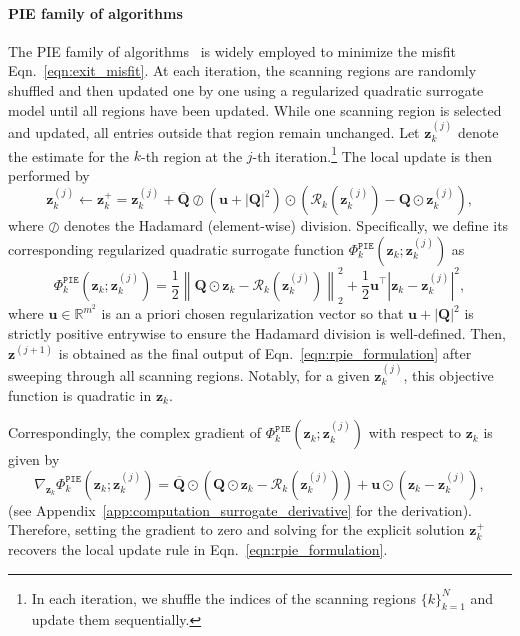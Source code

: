 \documentclass{article}
\numberwithin{equation}{section}
\begin{document}
\paragraph{PIE family of algorithms}
The PIE family of algorithms~\cite{PIE,ePIE,rPIE} is widely employed to minimize the misfit~ Eqn.~\eqref{eqn:exit_misfit}. At each iteration, the scanning regions are randomly shuffled and then updated one by one using a regularized quadratic surrogate model until all regions have been updated.  While one scanning region is selected and updated, all entries outside that region remain unchanged. Let $\bm{z}_k^{(j)}$ denote the estimate for the $k$-th region at the $j$-th iteration.\footnote{In each iteration, we shuffle the indices of the scanning regions $\{k\}_{k=1}^N$ and update them sequentially.} The local update is then performed by  
\begin{equation}\label{eqn:rpie_formulation}
\bm{z}_k^{(j)}\leftarrow \bm{z}_k^+ = \bm{z}_k^{(j)} + \overline{\bm{Q}}\oslash \left(\bm{u} + |\bm{Q}|^2\right)\odot\left(\mathcal{R}_k\left(\bm{z}_k^{(j)}\right) - \bm{Q}\odot\bm{z}_k^{(j)}\right),
\end{equation}
where $\oslash$ denotes the Hadamard (element-wise) division. Specifically, we  define its corresponding regularized quadratic surrogate function $\Phi^{\texttt{PIE}}_k\left(\bm{z}_k;\bm{z}_k^{(j)}\right)$ as
\begin{equation*} 
\Phi^{\texttt{PIE}}_k\left(\bm{z}_k ; \bm{z}_k^{(j)}\right) = \frac{1}{2} \left\|\bm{Q}\odot\bm{z}_k - \mathcal{R}_k\left(\bm{z}_k^{(j)}\right)\right\|_2^2 + \frac{1}{2}\bm{u}^\top\left|\bm{z}_k - \bm{z}_k^{(j)}\right|^2,
\end{equation*}
{where $\bm{u} \in \mathbb{R}^{m^2}$ is an a priori chosen regularization vector so that \(\bm{u}+|\bm{Q}|^2\) is strictly positive entrywise to ensure the Hadamard division is well-defined.} Then, $\bm{z}^{(j+1)}$ is obtained as the final output of  Eqn.~\eqref{eqn:rpie_formulation} after sweeping through all scanning regions. Notably, for a given $\bm{z}_k^{(j)}$, this objective function is quadratic in $\bm{z}_k$.
 
Correspondingly, the complex gradient of $\Phi^{\texttt{PIE}}_k\left(\bm{z}_k ; \bm{z}_k^{(j)}\right)$ with respect to $\bm{z}_k$ is given by
\begin{equation}\label{eqn:derivative_surrogate}
\nabla_{\bm{z}_k}\Phi^{\texttt{PIE}}_k\left(\bm{z}_k ; \bm{z}_k^{(j)}\right) = \overline{\bm{Q}}\odot\left(\bm{Q}\odot \bm{z}_k - \mathcal{R}_k\left(\bm{z}_k^{(j)}\right)\right) + \bm{u}\odot\left(\bm{z}_k - \bm{z}_k^{(j)}\right),
\end{equation}
(see Appendix~\ref{app:computation_surrogate_derivative} for the derivation). Therefore, setting the gradient to zero and solving for the explicit solution $\bm{z}_k^+$ recovers the local update rule in Eqn.~\eqref{eqn:rpie_formulation}.
\end{document}

